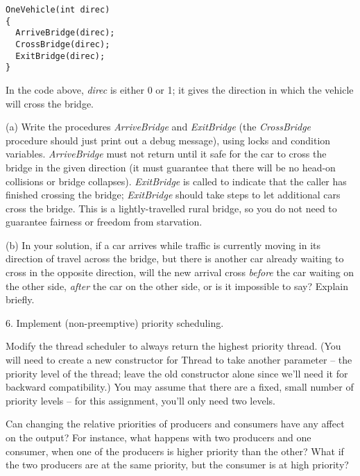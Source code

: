 \begin{description}
\begin{verbatim}
OneVehicle(int direc)
{
  ArriveBridge(direc);
  CrossBridge(direc);
  ExitBridge(direc);
}
\end{verbatim}

In the code above, {\em direc} is either 0 or 1;  it gives the
direction in which the vehicle will cross the bridge.

\begin{description}

\item{(a)} Write the procedures {\em ArriveBridge}
and {\em ExitBridge} (the {\em CrossBridge} procedure should just print 
out a debug message), using locks and condition variables.  {\em ArriveBridge} 
must not return until it safe
for the car to cross the bridge in the given direction (it
must guarantee that there will be no head-on collisions or
bridge collapses).  {\em ExitBridge} is called to indicate
that the caller has finished crossing the bridge;  {\em ExitBridge}
should take steps to let additional cars cross the bridge.
This is a lightly-travelled rural bridge, so
you do not need to guarantee fairness or freedom from starvation.

\item{(b)} In your solution, if a car arrives while traffic is currently moving
in its direction of travel across the bridge, but there is another
car already waiting to cross in the opposite direction, will the
new arrival cross {\em before} the car waiting on the other side,
{\em after} the car on the other side, or is it impossible to
say?  Explain briefly.

\end{description}

\end{description}



\item{6.}
Implement (non-preemptive) priority scheduling.  

Modify the thread scheduler to always return the 
highest priority thread.  (You will need to create a new constructor 
for Thread to take another parameter -- the priority level of the thread;
leave the old constructor alone since we'll need it for backward
compatibility.)  You may assume that there are a fixed, small 
number of priority levels -- for this assignment, you'll only need two levels.

Can changing the relative priorities of producers and consumers
have any affect on the output?  For instance, what happens with 
two producers and one consumer, when one of the
producers is higher priority than the other?  What if the two
producers are at the same priority, but the consumer is at high
priority?

